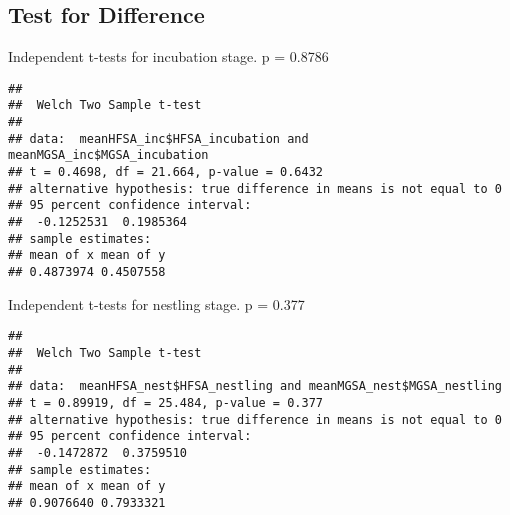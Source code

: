 \documentclass[
]{article}
\newenvironment{Shaded}{\begin{snugshade}}{\end{snugshade}}
\newcommand{\FunctionTok}[1]{\textcolor[rgb]{0.00,0.00,0.00}{#1}}
\newcommand{\NormalTok}[1]{#1}
\newcommand{\SpecialCharTok}[1]{\textcolor[rgb]{0.00,0.00,0.00}{#1}}
\begin{document}
\hypertarget{test-for-difference-1}{%
\subsection{Test for Difference}\label{test-for-difference-1}}

Independent t-tests for incubation stage. p = 0.8786

\begin{Shaded}
\end{Shaded}

\begin{verbatim}
## 
##  Welch Two Sample t-test
## 
## data:  meanHFSA_inc$HFSA_incubation and meanMGSA_inc$MGSA_incubation
## t = 0.4698, df = 21.664, p-value = 0.6432
## alternative hypothesis: true difference in means is not equal to 0
## 95 percent confidence interval:
##  -0.1252531  0.1985364
## sample estimates:
## mean of x mean of y 
## 0.4873974 0.4507558
\end{verbatim}

Independent t-tests for nestling stage. p = 0.377

\begin{Shaded}
\end{Shaded}

\begin{verbatim}
## 
##  Welch Two Sample t-test
## 
## data:  meanHFSA_nest$HFSA_nestling and meanMGSA_nest$MGSA_nestling
## t = 0.89919, df = 25.484, p-value = 0.377
## alternative hypothesis: true difference in means is not equal to 0
## 95 percent confidence interval:
##  -0.1472872  0.3759510
## sample estimates:
## mean of x mean of y 
## 0.9076640 0.7933321
\end{verbatim}
\end{document}
